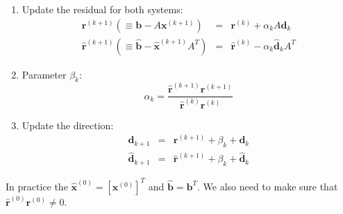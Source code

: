 \begin{enumerate}
\begin{enumerate}
        \item Update the residual for both systems:
        \begin{equation*}
            \begin{array}{rcl}
                \mathbf{r}^{\left(k+1\right)} \left(\equiv \mathbf{b} - A \mathbf{x}^{\left(k+1\right)}\right) &=& \mathbf{r}^{\left(k\right)} + \alpha_{k}A\mathbf{d}_{k} \\ [.5em]
                \widehat{\mathbf{r}}^{\left(k+1\right)} \left(\equiv \widehat{\mathbf{b}} - \widehat{\mathbf{x}}^{\left(k+1\right)} A^{T} \right) &=& \widehat{\mathbf{r}}^{\left(k\right)} - \alpha_{k}\widehat{\mathbf{d}}_{k} A^{T}
            \end{array}
        \end{equation*}

        \item Parameter $\beta_{k}$:
        \begin{equation*}
            \alpha_{k} = \dfrac{
                \widehat{\mathbf{r}}^{\left(k+1\right)} \mathbf{r}^{\left(k+1\right)}
            }{
                \widehat{\mathbf{r}}^{\left(k\right)} \mathbf{r}^{\left(k\right)}
            }
        \end{equation*}

        \item Update the direction:
        \begin{equation*}
            \begin{array}{rcl}
                \mathbf{d}_{k+1}            &=& \mathbf{r}^{\left(k+1\right)} + \beta_{k} + \mathbf{d}_{k} \\ [.5em]
                \widehat{\mathbf{d}}_{k+1}  &=& \widehat{\mathbf{r}}^{\left(k+1\right)} + \beta_{k} + \widehat{\mathbf{d}}_{k}
            \end{array}
        \end{equation*}
    \end{enumerate}
\end{enumerate}
In practice the $\widehat{\mathbf{x}}^{\left(0\right)} = \left[\mathbf{x}^{\left(0\right)}\right]^{T}$ and $\widehat{\mathbf{b}} = \mathbf{b}^{T}$. We also need to make sure that $\widehat{\mathbf{r}}^{\left(0\right)}\mathbf{r}^{\left(0\right)} \ne 0$.

